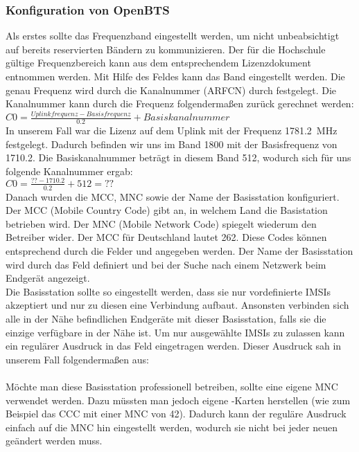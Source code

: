 \subsubsection{Konfiguration von OpenBTS}
Als erstes sollte das Frequenzband eingestellt werden, um nicht unbeabsichtigt auf bereits reservierten Bändern zu kommunizieren.  Der für die Hochschule gültige Frequenzbereich kann aus dem entsprechendem Lizenzdokument entnommen werden. Mit Hilfe des Feldes  kann das Band eingestellt werden. Die genau Frequenz wird durch die Kanalnummer (ARFCN) durch  festgelegt. Die Kanalnummer kann durch die Frequenz folgendermaßen zurück gerechnet werden:\\
$ C0 = \frac{Uplinkfrequenz - Basisfrequenz}{0.2} + Basiskanalnummer $ \\
In unserem Fall war die Lizenz auf dem Uplink mit der Frequenz \SI{1781.2}{\mega\hertz} festgelegt. Dadurch befinden wir uns im Band 1800 mit der Basisfrequenz von 1710.2. Die Basiskanalnummer beträgt in diesem Band 512, wodurch sich für uns folgende Kanalnummer ergab:\\
$ C0 = \frac{?? - 1710.2}{0.2} + 512 = ?? $ \\
Danach wurden die MCC, MNC sowie der Name der Basisstation konfiguriert. Der MCC (Mobile Country Code) gibt an, in welchem Land die Basistation betrieben wird. Der MNC (Mobile Network Code) spiegelt wiederum den Betreiber wider. Der MCC für Deutschland lautet 262. Diese Codes können entsprechend durch die Felder  und  angegeben werden. Der Name der Basisstation wird durch das Feld  definiert und bei der Suche nach einem Netzwerk beim Endgerät angezeigt. \\
Die Basisstation sollte so eingestellt werden, dass sie nur vordefinierte \acp{IMSI} akzeptiert und nur zu diesen eine Verbindung aufbaut. Ansonsten verbinden sich alle in der Nähe befindlichen Endgeräte mit dieser Basisstation, falls sie die einzige verfügbare in der Nähe ist. Um nur ausgewählte \acp{IMSI} zu zulassen kann ein regulärer Ausdruck in das Feld  eingetragen werden. Dieser Ausdruck sah in unserem Fall folgendermaßen aus: \\  \\
Möchte man diese Basisstation professionell betreiben, sollte eine eigene MNC verwendet werden. Dazu müssten man jedoch eigene \SIM-Karten herstellen (wie zum Beispiel das CCC mit einer MNC von 42). Dadurch kann der reguläre Ausdruck einfach auf die MNC hin eingestellt werden, wodurch sie nicht bei jeder neuen \IMSI geändert werden muss.


